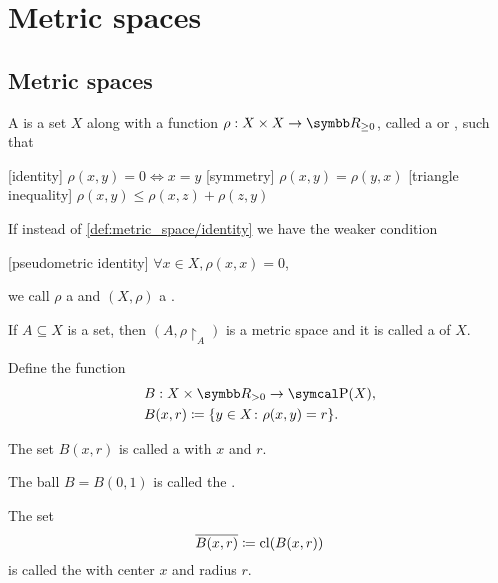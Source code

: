 \section{Metric spaces}\label{sec:metric_spaces}
\subsection{Metric spaces}\label{subsec:metric_spaces}

\begin{definition}\label{def:metric_space}\cite[248]{Engelking1989}
  A  is a set \( X \) along with a function \( \rho: X \times X \to \BR_{\geq 0} \), called a  or , such that
  \begin{description}
    [identity] \( \rho(x, y) = 0 \iff x = y \)
    [symmetry] \( \rho(x, y) = \rho(y, x) \)
    [triangle inequality] \( \rho(x, y) \leq \rho(x, z) + \rho(z, y) \)
  \end{description}

  If instead of \ref{def:metric_space/identity} we have the weaker condition
  \begin{description}
    [pseudometric identity] \( \forall x \in X, \rho(x, x) = 0 \),
  \end{description}
  we call \( \rho \) a  and \( (X, \rho) \) a .

  \begin{defenum}
     If \( A \subseteq X \) is a set, then \( (A, \rho{\restriction_A}) \) is a metric space and it is called a  of $X$.

     Define the function
    \begin{align*}
      &B: X \times \BR_{>0} \to \Power(X), \\
      &B(x, r) \coloneqq \{ y \in X \colon \rho(x, y) = r \}.
    \end{align*}

    The set \( B(x, r) \) is called a  with  \( x \) and  \( r \).

    The ball \( B = B(0, 1) \) is called the .

     The set
    \begin{equation*}
      \overline{B(x, r)} \coloneqq \operatorname{cl}(B(x, r))
    \end{equation*}
    is called the  with center \( x \) and radius \( r \).


\end{defenum}
\end{definition}
